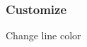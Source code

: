 \documentclass[color=usenames,dvipsnames]{beamer}
\begin{document}
\begin{frame}
  \frametitle{Customize}
    \begin{center}
      Change line color
    \end{center}
\end{frame}












\end{document}
